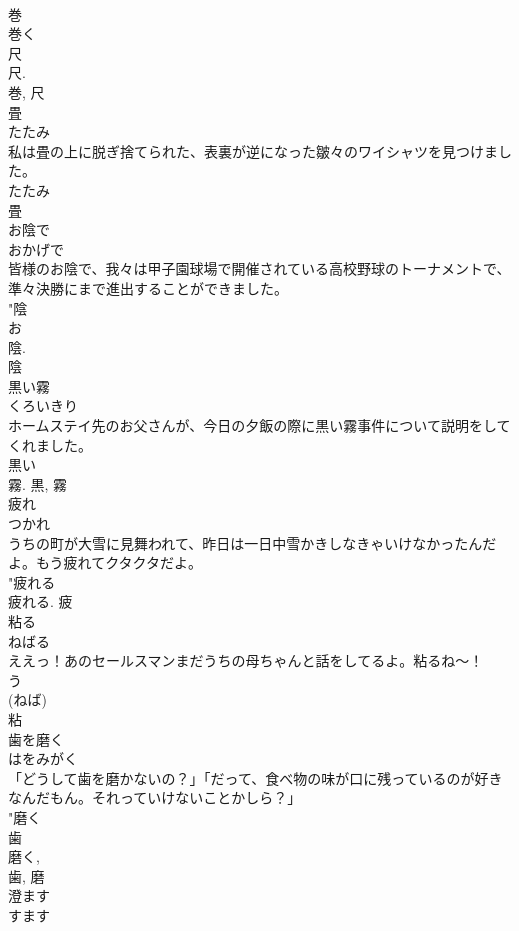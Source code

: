 \documentclass[8pt]{extreport}
\begin{document}
\begin{CJK}{UTF8}{min}
\\	巻 
\\	巻く 
\\	尺 
\\	尺. 
\\	巻, 尺	
\\	畳	
\\	たたみ	
\\	私は畳の上に脱ぎ捨てられた、表裏が逆になった皺々のワイシャツを見つけました。	
\\	たたみ 
\\	畳	
\\	お陰で	
\\	おかげで	
\\	皆様のお陰で、我々は甲子園球場で開催されている高校野球のトーナメントで、準々決勝にまで進出することができました。	
\\	"陰 
\\	お 
\\	陰. 
\\	陰	
\\	黒い霧	
\\	くろいきり	
\\	ホームステイ先のお父さんが、今日の夕飯の際に黒い霧事件について説明をしてくれました。	
\\	黒い 
\\	霧.	黒, 霧	
\\	疲れ	
\\	つかれ	
\\	うちの町が大雪に見舞われて、昨日は一日中雪かきしなきゃいけなかったんだよ。もう疲れてクタクタだよ。	
\\	"疲れる 
\\	疲れる.	疲	
\\	粘る	
\\	ねばる	
\\	ええっ！あのセールスマンまだうちの母ちゃんと話をしてるよ。粘るね〜！	
\\	う 
\\	(ねば) 
\\	粘	
\\	歯を磨く	
\\	はをみがく	
\\	「どうして歯を磨かないの？」「だって、食べ物の味が口に残っているのが好きなんだもん。それっていけないことかしら？」	
\\	"磨く 
\\	歯 
\\	磨く, 
\\	歯, 磨	
\\	澄ます	
\\	すます	

\end{CJK}
\end{document}
